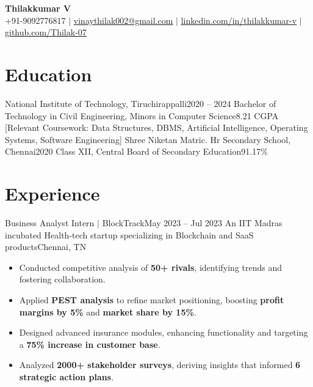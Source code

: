 \documentclass[letterpaper,11pt]{article}
\newcommand{\resumeItem}[1]{
  \item\small{
    {#1 \vspace{-2pt}}
  }
}
\newcommand{\resumeSubHeadingListStart}{\begin{itemize}[leftmargin=0.15in, label={}]}
\newcommand{\resumeSubHeadingListEnd}{\end{itemize}}
\newcommand{\resumeItemListStart}{\begin{itemize}}
\newcommand{\resumeItemListEnd}{\end{itemize}\vspace{-5pt}}
\begin{document}
\begin{center}
    \textbf{\Huge Thilakkumar V} \\ \vspace{2pt}
    {\raisebox{0.0\height}{\footnotesize \faPhone}
    \footnotesize +91-9092776817} $|$
    \href{mailto:vinaythilak002@gmail.com}
    {\raisebox{-0.1\height}{\footnotesize \faEnvelope}
    \footnotesize \underline{vinaythilak002@gmail.com}} $|$ 
    \href{https://www.linkedin.com/in/thilakkumar-v-65610a200/}
    {\raisebox{-0.1\height}{\footnotesize \faLinkedin}
    \footnotesize \underline{linkedin.com/in/thilakkumar-v}} $|$
    \href{https://github.com/Thilak-07}
    {\raisebox{-0.1\height}{\footnotesize \faGithub}
    \footnotesize \underline{github.com/Thilak-07}}
\end{center}


\section{Education}
  \resumeSubHeadingListStart
    \resumeSubheading
      {National Institute of Technology, Tiruchirappalli}{2020 -- 2024}
      {Bachelor of Technology in Civil Engineering, Minors in Computer Science}{8.21 CGPA}
      [Relevant Coursework: Data Structures, DBMS, Artificial Intelligence, Operating Systems, Software Engineering]
    \vspace{-2pt}
    \resumeSubheading
      {Shree Niketan Matric. Hr Secondary School, Chennai}{2020}
      {Class XII, Central Board of Secondary Education}{91.17\%}
  \resumeSubHeadingListEnd \vspace{-5pt}


\section{Experience}
  \resumeSubHeadingListStart
    \resumeSubheading
      {{Business Analyst Intern} $|$ {BlockTrack}}{May 2023 -- Jul 2023}
      {An IIT Madras incubated Health-tech startup specializing in Blockchain and SaaS products}{Chennai, TN}
      \resumeItemListStart
        \resumeItem{Conducted competitive analysis of \textbf{50+ rivals}, identifying trends and fostering collaboration.}
        \resumeItem{Applied \textbf{PEST analysis} to refine market positioning, boosting \textbf{profit margins by 5\%} and \textbf{market share by 15\%}.}
        \resumeItem{Designed advanced insurance modules, enhancing functionality and targeting a \textbf{75\% increase in customer base}.}
        \resumeItem{Analyzed \textbf{2000+ stakeholder surveys}, deriving insights that informed \textbf{6 strategic action plans}.}
      \resumeItemListEnd
  \resumeSubHeadingListEnd
\end{document}
